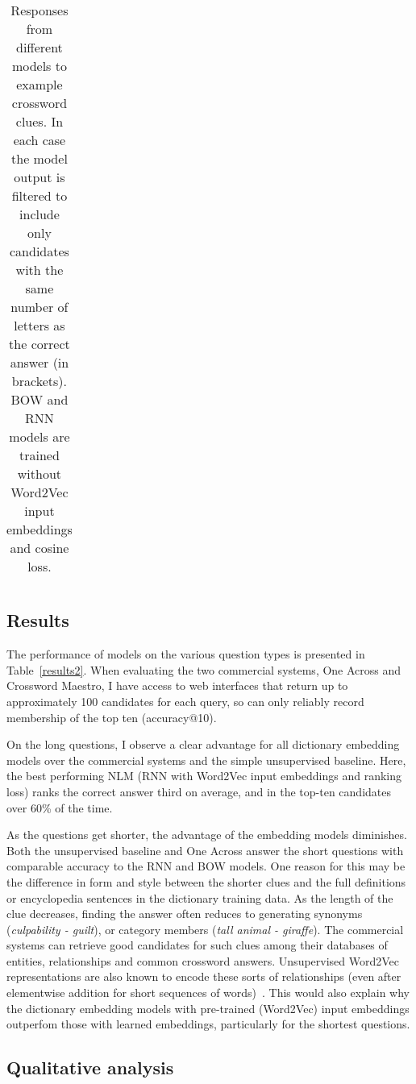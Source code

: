 \begin{table*}[ht]
{\begin{tabular}{r|ccccc|}
\end{tabular}}
\hfill{}
\caption{Responses from different models to example crossword clues. In each case the model output is filtered to include only candidates with the same number of letters as the correct answer (in brackets). BOW and RNN models are trained without Word2Vec input embeddings and cosine loss.}
\label{egs}
\end{table*}

\subsection{Results}

The performance of models on the various question types is presented in Table~\ref{results2}. When evaluating the two commercial systems, One Across and Crossword Maestro, I have access to web interfaces that return up to approximately 100 candidates for each query, so can only reliably record membership of the top ten (accuracy@10).

On the long questions, I observe a clear advantage for all dictionary embedding models over the commercial systems and the simple unsupervised baseline. Here, the best performing NLM (RNN with Word2Vec input embeddings and ranking loss) ranks the correct answer third on average, and in the top-ten candidates over 60\% of the time.
	
As the questions get shorter, the advantage of the embedding models diminishes. Both the unsupervised baseline and One Across answer the short questions with comparable accuracy to the RNN and BOW models. One reason for this may be the difference in form and style between the shorter clues and the full definitions or encyclopedia sentences in the dictionary training data. As the length of the clue decreases, finding the answer often reduces to generating synonyms (\emph{culpability - guilt}), or category members (\emph{tall animal - giraffe}). The commercial systems can retrieve good candidates for such clues among their databases of entities, relationships and common crossword answers. Unsupervised Word2Vec representations are also  known to encode these sorts of relationships (even after elementwise addition for short sequences of words)~\citep{mikolov2013distributed}. This would also explain why the dictionary embedding models with pre-trained (Word2Vec) input embeddings outperfom those with learned embeddings, particularly for the shortest questions. 


\subsection{Qualitative analysis}


